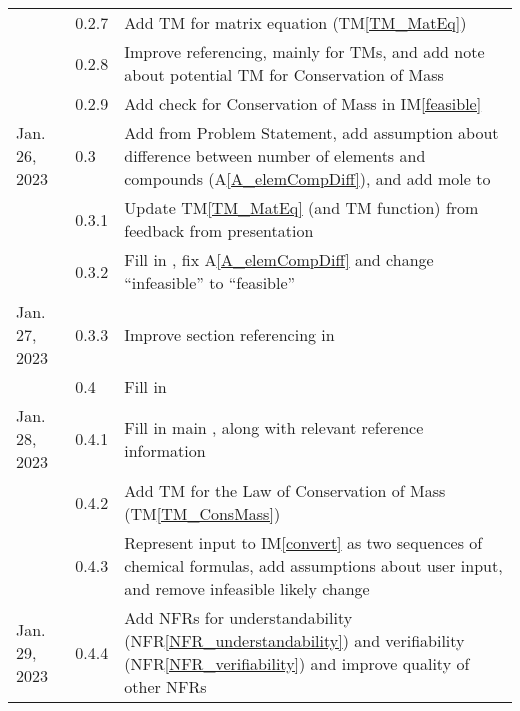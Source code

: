 \documentclass[12pt]{article}
\newcommand{\tref}[1]{TM\ref{#1}}
\newcommand{\aref}[1]{A\ref{#1}}
\newcommand{\iref}[1]{IM\ref{#1}}
\newcommand{\nfrref}[1]{NFR\ref{#1}}
\begin{document}
\begin{tabularx}{\textwidth}{p{2.5cm}p{1.5cm}X}
                      & 0.2.7         & Add TM for matrix equation (\tref{TM_MatEq})                        \\
                      & 0.2.8         & Improve referencing, mainly for TMs, and add note about
  potential TM for Conservation of Mass                                                                     \\
                      & 0.2.9         & Add check for Conservation of Mass in \iref{feasible}               \\
  Jan. 26, 2023       & 0.3           & Add \nameref{sec_LCs} from Problem Statement, add
  assumption about difference between number of elements and compounds
  (\aref{A_elemCompDiff}), and add mole to \nameref{sec_ToU}                                                \\
                      & 0.3.1         & Update \tref{TM_MatEq} (and TM function) from feedback from
  presentation                                                                                              \\
                      & 0.3.2         & Fill in \nameref{sec_scope}, fix \aref{A_elemCompDiff} and
  change ``infeasible'' to ``feasible''                                                                     \\
  Jan. 27, 2023       & 0.3.3         & Improve section referencing in \nameref{sec_revHist}                \\
                      & 0.4           & Fill in \nameref{sec_funcReqs}                                      \\
  Jan. 28, 2023       & 0.4.1         & Fill in main \nameref{sec_nonfuncReqs}, along with
  relevant reference information                                                                            \\
                      & 0.4.2         & Add TM for the Law of Conservation of Mass
  (\tref{TM_ConsMass})                                                                                      \\
                      & 0.4.3         & Represent input to \iref{convert} as two sequences of chemical
  formulas, add assumptions about user input, and remove infeasible
  likely change                                                                                             \\
  Jan. 29, 2023       & 0.4.4         & Add NFRs for understandability
  (\nfrref{NFR_understandability}) and verifiability
  (\nfrref{NFR_verifiability}) and improve quality of other NFRs                                            \\

\end{tabularx}
\end{document}
